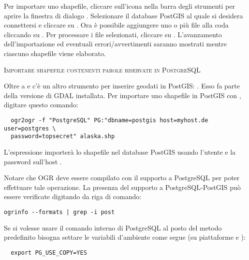 Per importare uno shapefile, cliccare sull'icona
nella barra degli strumenti per aprire la finestra di
dialogo .
Selezionare il database PostGIS al quale si desidera connettersi
e cliccare su .
Ora è possibile aggiungere uno o più file alla coda
cliccando su . Per processare i file selezionati, cliccare
su . L'avanzamento dell'importazione ed eventuali
errori/avvertimenti saranno mostrati mentre ciascuno shapefile viene
elaborato.
\begin{Tip}\caption{\textsc{Importare shapefile contenenti parole riservate in PostgreSQL}}
\end{Tip} 

Oltre a  e  c'è un altro strumento per
inserire geodati in PostGIS: . Esso fa parte della versione
di GDAL installata.
Per importare uno shapefile in PostGIS con , digitare questo
comando:
\begin{verbatim}
  ogr2ogr -f "PostgreSQL" PG:"dbname=postgis host=myhost.de user=postgres \
  password=topsecret" alaska.shp
\end{verbatim}

L'espressione importerà lo shapefile  nel database PostGIS
\usertext{postgis}
usando l'utente  e la password  sull'host
\server{myhost.de}.

Notare che OGR deve essere compilato con il supporto a PostgreSQL per poter
effettuare tale operazione.
La presenza del supporto a PostgreSQL-PostGIS può essere verificate digitando
da riga di comando:
\begin{verbatim}
ogrinfo --formats | grep -i post
\end{verbatim}

Se si volesse usare il comando interno di PostgreSQL  al posto
del metodo predefinito \filename{INSERT INTO} bisogna settare le variabili
d'ambiente come segue (su piattaforme \nix e \osx):
\begin{verbatim}
  export PG_USE_COPY=YES
\end{verbatim}

